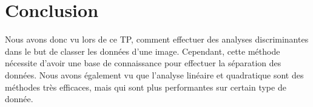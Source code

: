 \documentclass[a4paper,11pt]{article}
\begin{document}
  
  \section*{Conclusion}
  Nous avons donc vu lors de ce TP, comment effectuer des analyses
  discriminantes dans le but de classer les données d'une
  image. Cependant, cette méthode nécessite d'avoir une base de
  connaissance %
  pour effectuer
  la séparation des données. Nous avons également vu que l'analyse
  linéaire et quadratique sont des méthodes très efficaces, mais qui
  sont plus performantes sur certain type de donnée.
\end{document}
